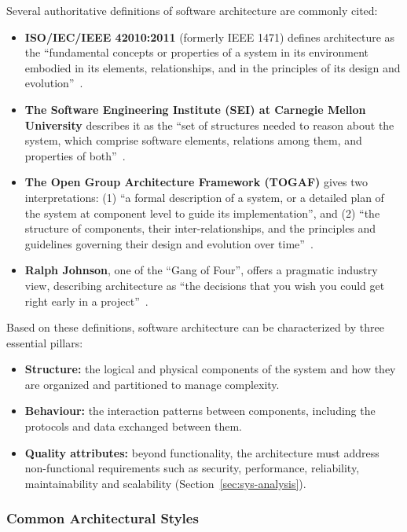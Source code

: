Several authoritative definitions of software architecture are commonly cited:
\begin{itemize}
    \item \textbf{ISO/IEC/IEEE 42010:2011} (formerly IEEE 1471) defines architecture as the ``fundamental concepts or properties of a system in its environment embodied in its elements, relationships, and in the principles of its design and evolution''~\cite{iso42010}.
    \item \textbf{The Software Engineering Institute (SEI) at Carnegie Mellon University} describes it as the ``set of structures needed to reason about the system, which comprise software elements, relations among them, and properties of both''~\cite{bass-sei}.
    \item \textbf{The Open Group Architecture Framework (TOGAF)} gives two interpretations: (1) ``a formal description of a system, or a detailed plan of the system at component level to guide its implementation'', and (2) ``the structure of components, their inter-relationships, and the principles and guidelines governing their design and evolution over time''~\cite{togaf}.
    \item \textbf{Ralph Johnson}, one of the ``Gang of Four'', offers a pragmatic industry view, describing architecture as ``the decisions that you wish you could get right early in a project''~\cite{fowler-architect}.
\end{itemize}

Based on these definitions, software architecture can be characterized by three essential pillars:
\begin{itemize}
    \item \textbf{Structure:} the logical and physical components of the system and how they are organized and partitioned to manage complexity.
    \item \textbf{Behaviour:} the interaction patterns between components, including the protocols and data exchanged between them.
    \item \textbf{Quality attributes:} beyond functionality, the architecture must address non-functional requirements such as security, performance, reliability, maintainability and scalability (Section~\ref{sec:sys-analysis}).
\end{itemize}

\subsubsection{Common Architectural Styles}
\label{subsubsec:architecture-styles}

